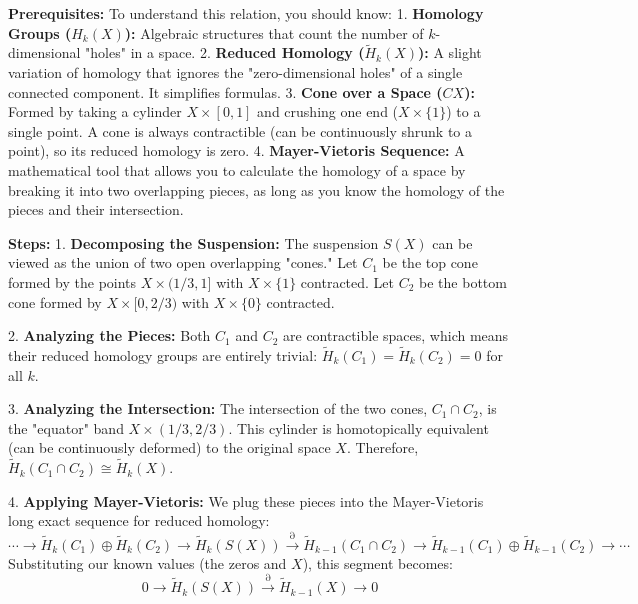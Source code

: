 \begin{solution}
\textbf{Prerequisites:}
To understand this relation, you should know:
1. \textbf{Homology Groups ($H_k(X)$):} Algebraic structures that count the number of $k$-dimensional "holes" in a space.
2. \textbf{Reduced Homology ($\tilde{H}_k(X)$):} A slight variation of homology that ignores the "zero-dimensional holes" of a single connected component. It simplifies formulas.
3. \textbf{Cone over a Space ($CX$):} Formed by taking a cylinder $X \times [0,1]$ and crushing one end ($X \times \{1\}$) to a single point. A cone is always contractible (can be continuously shrunk to a point), so its reduced homology is zero.
4. \textbf{Mayer-Vietoris Sequence:} A mathematical tool that allows you to calculate the homology of a space by breaking it into two overlapping pieces, as long as you know the homology of the pieces and their intersection.
\par\vspace{\baselineskip}

\textbf{Steps:}
1. \textbf{Decomposing the Suspension:}
The suspension $S(X)$ can be viewed as the union of two open overlapping "cones." Let $C_1$ be the top cone formed by the points $X \times (1/3, 1]$ with $X \times \{1\}$ contracted. Let $C_2$ be the bottom cone formed by $X \times [0, 2/3)$ with $X \times \{0\}$ contracted.
\par\vspace{\baselineskip}

2. \textbf{Analyzing the Pieces:}
Both $C_1$ and $C_2$ are contractible spaces, which means their reduced homology groups are entirely trivial: $\tilde{H}_k(C_1) = \tilde{H}_k(C_2) = 0$ for all $k$.
\par\vspace{\baselineskip}

3. \textbf{Analyzing the Intersection:}
The intersection of the two cones, $C_1 \cap C_2$, is the "equator" band $X \times (1/3, 2/3)$. This cylinder is homotopically equivalent (can be continuously deformed) to the original space $X$. Therefore, $\tilde{H}_k(C_1 \cap C_2) \cong \tilde{H}_k(X)$.
\par\vspace{\baselineskip}

4. \textbf{Applying Mayer-Vietoris:}
We plug these pieces into the Mayer-Vietoris long exact sequence for reduced homology:
\[ \cdots \to \tilde{H}_k(C_1) \oplus \tilde{H}_k(C_2) \to \tilde{H}_k(S(X)) \xrightarrow{\partial} \tilde{H}_{k-1}(C_1 \cap C_2) \to \tilde{H}_{k-1}(C_1) \oplus \tilde{H}_{k-1}(C_2) \to \cdots \]
Substituting our known values (the zeros and $X$), this segment becomes:
\[ 0 \to \tilde{H}_k(S(X)) \xrightarrow{\partial} \tilde{H}_{k-1}(X) \to 0 \]
\par\vspace{\baselineskip}


\end{solution}
